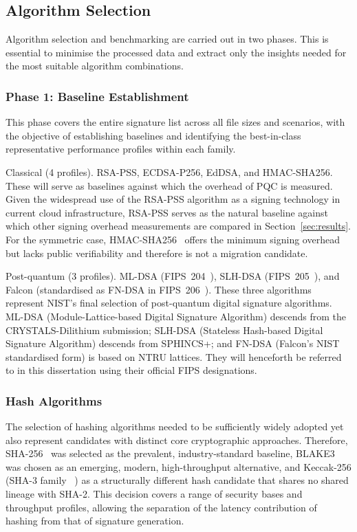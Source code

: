 \documentclass[12pt,a4paper]{article}
\begin{document}
\subsection{Algorithm Selection}

Algorithm selection and benchmarking are carried out in two phases. This is essential to minimise the processed data and extract only the insights needed for the most suitable algorithm combinations.

\subsubsection{Phase 1: Baseline Establishment}

This phase covers the entire signature list across all file sizes and scenarios, with the objective of establishing baselines and identifying the best-in-class representative performance profiles within each family.

Classical (4 profiles). RSA-PSS, ECDSA-P256, EdDSA, and HMAC-SHA256. These will serve as baselines against which the overhead of PQC is measured. Given the widespread use of the RSA-PSS algorithm as a signing technology in current cloud infrastructure, RSA-PSS serves as the natural baseline against which other signing overhead measurements are compared in Section~\ref{sec:results}. For the symmetric case, HMAC-SHA256~\cite{rfc2104-hmac} offers the minimum signing overhead but lacks public verifiability and therefore is not a migration candidate.

Post-quantum (3 profiles). ML-DSA (FIPS~204~\cite{nist-fips-204-2024}),
    SLH-DSA (FIPS~205~\cite{nist-fips-205-2024}), and Falcon (standardised as FN-DSA in FIPS~206~\cite{nist-fips206-2024}). These three algorithms represent NIST's final selection of post-quantum digital signature algorithms. ML-DSA (Module-Lattice-based Digital Signature Algorithm) descends from the CRYSTALS-Dilithium submission; SLH-DSA (Stateless Hash-based Digital Signature Algorithm) descends from SPHINCS+; and FN-DSA (Falcon's NIST standardised form) is based on NTRU lattices. They will henceforth be referred to in this dissertation using their official FIPS designations.

\subsubsection{Hash Algorithms}

The selection of hashing algorithms needed to be sufficiently widely adopted yet also represent candidates with distinct core cryptographic approaches. Therefore, SHA-256~\cite{nist-fips-186-5-2023} was selected as the prevalent, industry-standard baseline, BLAKE3~\cite{blake3-2020} was chosen as an emerging, modern, high-throughput alternative, and Keccak-256 (SHA-3 family ~\cite{nist-fips-202-2015}) as a structurally different hash candidate that shares no shared lineage with SHA-2. This decision covers a range of security bases and throughput profiles, allowing the separation of the latency contribution of hashing from that of signature generation.
\end{document}
